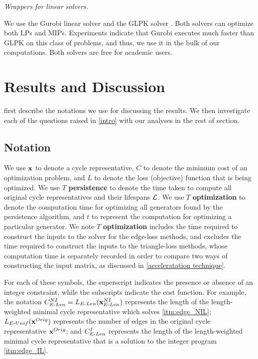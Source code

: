 \emph{Wrappers for linear solvers.} \label{linear solvers} 

We use the Gurobi linear solver \cite{gurobi} and the GLPK  solver \cite{glpk}. Both solvers can optimize both LPs and MIPs. Experiments indicate that Gurobi executes much faster than GLPK on this class of problems, and thus, we use it in the bulk of our computations. Both solvers are free for academic users. 

 
\section{Results and Discussion}\label{results}

 \DIFdelbegin {}\DIFdelend \DIFaddbegin {}\DIFaddend first describe the notations we use for discussing the results\DIFdelbegin {}\DIFdelend . We then investigate each of the questions raised in \se \ref{intro} with our analyses in the rest of \DIFdelbegin {}\DIFdelend \DIFaddbegin {}\DIFaddend section.

\subsection{Notation}\label{notations}

We use $\mathbf{x}$ to denote a cycle representative, $C$ to denote the minimum cost of an optimization problem, and $L$ to denote the loss (objective) function that is being optimized. 
We use $T$ \textbf{persistence} to denote the time taken to compute all original cycle representatives and their lifespans $\mathcal{L}$. We use $T$ \textbf{optimization} to denote the computation time for optimizing all generators found by the persistence algorithm, and $t$ to represent the computation for optimizing a particular generator. We note $T$ \textbf{optimization} includes the time required to construct the inputs to the solver for the edge-loss methods, and excludes the time required to construct the inputs to the triangle-loss methods, whose computation time is separately recorded in order to compare two ways of constructing the input matrix, as discussed in \se \ref{acceleratation technique}. 


For each of these symbols, the superscript indicates the presence or absence of an integer constraint, while the subscripts indicate the cost function.  
For example, the notation $C_{E\text{-}Len}^{NI} = L_{E\text{-}Len}(\mathbf{x}_{E\text{-}Len}^{NI})$ represents the length of the length-weighted minimal cycle representative which solves \ref{itm:edge_NIL}; $L_{E\text{-}Unif}(\mathbf{x}^{Orig})$ represents the number of edges in the original cycle representative $\mathbf{x}^{Orig}$; and $C_{E\text{-}Len}^I$ represents the length of the length-weighted minimal cycle representative that is a solution to the integer program \ref{itm:edge_IL}. 



